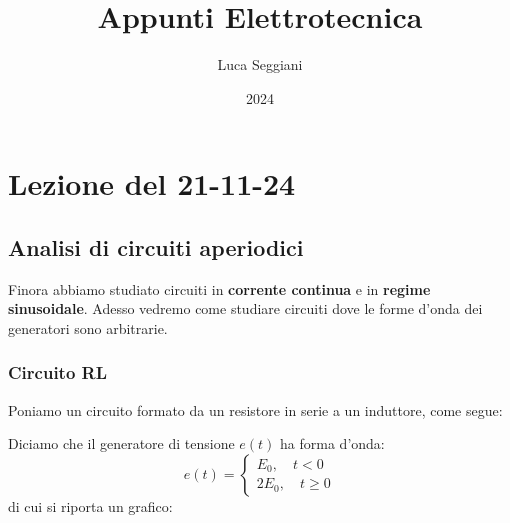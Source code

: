\documentclass[a4paper,11pt]{article}
\title{Appunti Elettrotecnica}
\author{Luca Seggiani}
\date{2024}
\begin{document}
\section{Lezione del 21-11-24}

\thispagestyle{empty}
\pagestyle{fancy}

\subsection{Analisi di circuiti aperiodici}
Finora abbiamo studiato circuiti in \textbf{corrente continua} e in \textbf{regime sinusoidale}.
Adesso vedremo come studiare circuiti dove le forme d'onda dei generatori sono arbitrarie.

\subsubsection{Circuito RL}
Poniamo un circuito formato da un resistore in serie a un induttore, come segue:

\begin{center}
\end{center}

Diciamo che il generatore di tensione $e(t)$ ha forma d'onda:
\[
	e(t) =
	\begin{cases}
		E_0, \quad t < 0 \\ 
		2E_0, \quad t \geq 0
	\end{cases}
\]
di cui si riporta un grafico:
\begin{center}
\end{center}
\end{document}
